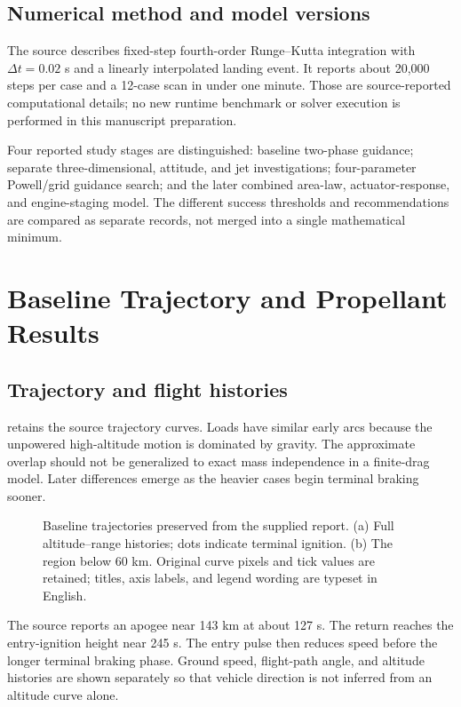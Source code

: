 \documentclass[11pt,a4paper]{article}
\begin{document}
\subsection{Numerical method and model versions}
The source describes fixed-step fourth-order Runge--Kutta integration with $\Delta t=0.02$ s and a linearly interpolated landing event. It reports about 20,000 steps per case and a 12-case scan in under one minute. Those are source-reported computational details; no new runtime benchmark or solver execution is performed in this manuscript preparation.

Four reported study stages are distinguished: baseline two-phase guidance; separate three-dimensional, attitude, and jet investigations; four-parameter Powell/grid guidance search; and the later combined area-law, actuator-response, and engine-staging model. The different success thresholds and recommendations are compared as separate records, not merged into a single mathematical minimum.

\section{Baseline Trajectory and Propellant Results}
\subsection{Trajectory and flight histories}
 retains the source trajectory curves. Loads have similar early arcs because the unpowered high-altitude motion is dominated by gravity. The approximate overlap should not be generalized to exact mass independence in a finite-drag model. Later differences emerge as the heavier cases begin terminal braking sooner.

\begin{figure}[htbp]
\centering\SourceTrajectory
\caption{Baseline trajectories preserved from the supplied report. (a) Full altitude--range histories; dots indicate terminal ignition. (b) The region below 60 km. Original curve pixels and tick values are retained; titles, axis labels, and legend wording are typeset in English.}
\label{fig:trajectory}
\end{figure}

The source reports an apogee near 143 km at about 127 s. The return reaches the entry-ignition height near 245 s. The entry pulse then reduces speed before the longer terminal braking phase. Ground speed, flight-path angle, and altitude histories are shown separately so that vehicle direction is not inferred from an altitude curve alone.
\end{document}
